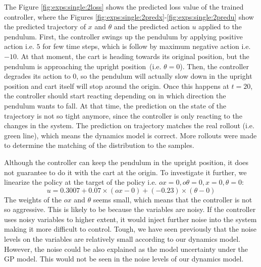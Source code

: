 \noindent The Figure \ref{fig:exps:single:2loss} shows the predicted loss value of the trained controller, where the Figures \ref{fig:exps:single:2predx}-\ref{fig:exps:single:2predu} show the predicted trajectory of $x$ and $\theta$ and the predicted action $u$ applied to the pendulum. First, the controller swings up the pendulum by applying positive action i.e. $5$ for few time steps, which is follow by maximum negative action i.e. $-10$. At that moment, the cart is heading towards its original position, but the pendulum is approaching the upright position\ (i.e. $\theta=0$). Then, the controller degrades its action to $0$, so the pendulum will actually slow down in the upright position and cart itself will stop around the origin.  Once this happens at $t=20$, the controller should start reacting depending on in which direction the pendulum wants to fall. At that time, the prediction on the state of the trajectory is not so tight anymore, since the controller is only reacting to the changes in the system. The prediction on trajectory matches the real rollout (i.e. green line), which means  the dynamics model is correct. More rollouts were made to determine the matching of the distribution to the samples.

\noindent Although the controller can keep the pendulum in the upright position, it does not guarantee to do it with the cart at the origin. To investigate it further, we linearize the policy at the target of the policy i.e. $ox=0, o\theta=0, x=0, \theta=0$: 
\begin{equation} \label{eq:exps:smk}
u=0.3007 + 0.07 \times (ox-0) + (-0.23) \times (\theta-0) \nonumber
\end{equation}
The weights of the $ox$ and $\theta$ seems small, which means that the controller is not so aggressive. This is likely to be because the variables are noisy. If the controller uses noisy variables to higher extent, it would inject further noise into the system making it more difficult to control. Tough, we have seen previously that the noise levels on the variables are relatively small according to our dynamics model. However, the noise could be also explained as the model uncertainty under the GP model. This would not be seen in the noise levels of our dynamics model.

